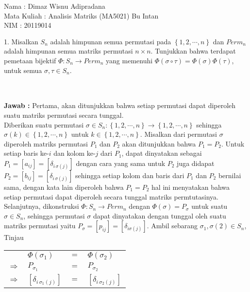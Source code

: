 \documentclass[11pt,a4paper]{article}
\theoremstyle{plain}
\theoremstyle{definition}
\theoremstyle{remark}
\begin{document}
\begin{enumerate}
Nama : Dimaz Wisnu Adipradana\\
Mata Kuliah : Analisis Matriks (MA5021) Bu Intan\\
NIM : 20119014\\

\begin{enumerate}
	\- \\ \- \\
	\textbf{Jawab :} Pertama, akan ditunjukkan bahwa setiap permutasi dapat diperoleh suatu matriks permutasi secara tunggal.\\
	Diberikan suatu permutasi $\sigma\in S_{n}: \left\{ 1,2,\cdots,n\right\}\rightarrow \left\{ 1,2,\cdots,n\right\}$ sehingga $\sigma(k)\in \left\{ 1,2,\cdots,n\right\}$ untuk $k\in \left\{ 1,2,\cdots,n\right\}$. Misalkan dari permutasi $\sigma$ diperoleh matriks permutasi $P_{1}$ dan $P_{2}$ akan ditunjukkan bahwa $P_{1}=P_{2}$. Untuk setiap baris ke-$i$ dan kolom ke-$j$ dari $P_{1}$, dapat dinyatakan sebagai $P_{1}=[a_{ij}]=[\delta_{i\,\sigma(j)}]$ dengan cara yang sama untuk $P_{2}$ juga didapat $P_{2}=[b_{ij}]=[\delta_{i\,\sigma(j)}]$ sehingga setiap kolom dan baris dari $P_{1}$ dan $P_{2}$ bernilai sama, dengan kata lain diperoleh bahwa $P_{1}=P_{2}$ hal ini menyatakan bahwa setiap permutasi dapat diperoleh secara tunggal matriks permtutasinya.\\
	Selanjutnya, dikonstruksi $\Phi: S_{n}\rightarrow Perm_{n}$ dengan $\Phi(\sigma)=P_{\sigma}$ untuk suatu $\sigma \in S_{n}$, sehingga permutasi $\sigma$ dapat dinyatakan dengan tunggal oleh suatu matriks permutasi yaitu $P_{\sigma}=[p_{ij}]=[\delta_{i\sigma(j)}]$. Ambil sebarang $\sigma_{1},\sigma(2)\in S_{n}$, Tinjau
	\begin{center}
		\begin{tabular}{llll}
		& $\Phi(\sigma_{1})$           & $=$ & $\Phi(\sigma_{2})$           \\
		$\Rightarrow$ & $P_{\sigma_{1}}$             & $=$ & $P_{\sigma_{2}}$             \\
		$\Rightarrow$ & $[\delta_{i\, \sigma_{1}(j)}]$ & $=$ & $[\delta_{i\, \sigma_{2}(j)}]$

\end{tabular}
\end{center}
\end{enumerate}
\end{enumerate}
\end{document}
